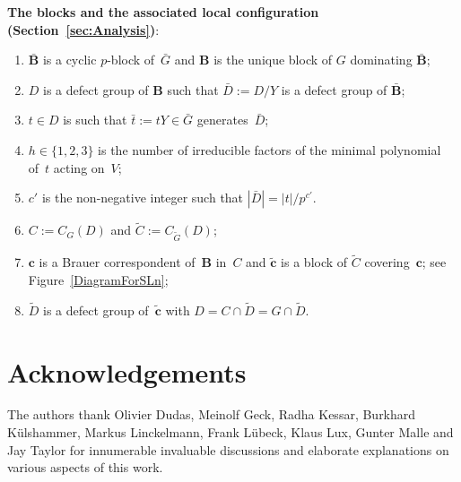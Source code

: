 \documentclass[12pt]{amsart}
\newcommand{\bB}{{\mathbf{B}}}
\newcommand{\bc}{{\mathbf{c}}}
\theoremstyle{theorem}
\theoremstyle{definition}
\theoremstyle{remark}
\begin{document}
\noindent\textbf{The blocks and the associated local configuration (Section~\ref{sec:Analysis})}: 
\begin{enumerate}[label=$\bullet$, leftmargin=5mm]
        \item  $\bar{\bB}$ is a cyclic $p$-block of~$\bar{G}$ and $\bB$ is the unique 
               block of $G$ dominating $\bar{\bB}$;
        \item  $D$ is a defect group of $\bB$ such that $\bar{D} := D/Y$ is 
               a defect group of $\bar{\bB}$;
        \item  $t \in D$ is such that $\bar{t} := tY \in \bar{G}$ 
               generates~$\bar{D}$;
        \item  $h \in \{ 1, 2, 3 \}$ is the number of irreducible factors of the minimal 
               polynomial of~$t$ acting on~$V$; 
        \item  $c'$ is the non-negative integer such that $|\bar{D}| = |t|/p^{c'}$.
        \item  $C := C_G( D )$ and $\tilde{C} := C_{\tilde{G}}( D )$;
        \item  $\bc$ is a Brauer correspondent of~$\bB$ in~$C$ and $\tilde{\bc}$
               is a block of $\tilde{C}$ covering~$\bc$; see Figure~\ref{DiagramForSLn};
        \item  $\tilde{D}$ is a defect group of~$\tilde{\bc}$ with $D = C \cap \tilde{D}
               = G \cap \tilde{D}$.
\end{enumerate}

\section*{Acknowledgements}

The authors thank Olivier Dudas, Meinolf Geck, Radha Kessar, 
Burkhard K{\"u}ls\-ham\-mer,
Markus Linckelmann, Frank L{\"u}beck,
Klaus Lux, Gunter Malle and Jay Taylor for innumerable invaluable discussions
and elaborate explanations on various aspects of this work.
\end{document}
